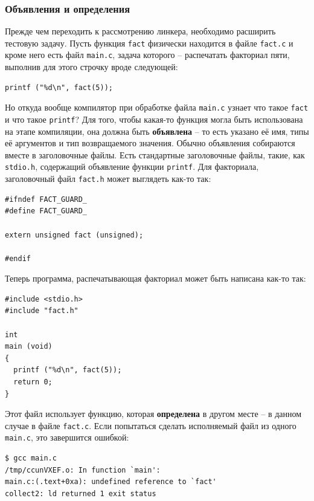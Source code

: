 \documentclass[a4paper,12pt,oneside]{article}
\begin{document}
\subsubsection{Объявления и определения}\label{subsubsec:DeclDef}

Прежде чем переходить к рассмотрению линкера, необходимо расширить тестовую задачу. Пусть функция \lstinline!fact! физически находится в файле \lstinline!fact.c! и кроме него есть файл \lstinline!main.c!, задача которого -- распечатать факториал пяти, выполнив для этого строчку вроде следующей:

\begin{lstlisting}
printf ("%d\n", fact(5));
\end{lstlisting}

Но откуда вообще компилятор при обработке файла \lstinline!main.c! узнает что такое \lstinline!fact! и что такое \lstinline!printf!? Для того, чтобы какая-то функция могла быть использована на этапе компиляции, она должна быть \textbf{объявлена} -- то есть указано её имя, типы её аргументов и тип возвращаемого значения. Обычно объявления собираются вместе в заголовочные файлы. Есть стандартные заголовочные файлы, такие, как \lstinline!stdio.h!, содержащий объявление функции \lstinline!printf!. Для факториала, заголовочный файл \lstinline!fact.h! может выглядеть как-то так:

\begin{lstlisting}
#ifndef FACT_GUARD_
#define FACT_GUARD_

extern unsigned fact (unsigned);

#endif
\end{lstlisting}

Теперь программа, распечатывающая факториал может быть написана как-то так:

\begin{lstlisting}
#include <stdio.h>
#include "fact.h"

int
main (void)
{
  printf ("%d\n", fact(5));
  return 0;
}
\end{lstlisting}

Этот файл использует функцию, которая \textbf{определена} в другом месте -- в данном случае в файле \lstinline!fact.c!. Если попытаться сделать исполняемый файл из одного \lstinline!main.c!, это завершится ошибкой:

\begin{verbatim}
$ gcc main.c
/tmp/ccunVXEF.o: In function `main':
main.c:(.text+0xa): undefined reference to `fact'
collect2: ld returned 1 exit status
\end{verbatim}
\end{document}
